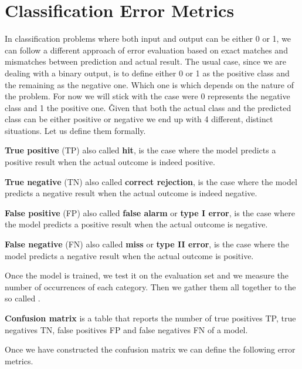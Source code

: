 \section{Classification Error Metrics}

In classification problems where both input and output can be either 0 or 1, we can follow a different approach of
error evaluation based on exact matches and mismatches between prediction and actual result. The usual case, since we
are dealing with a binary output, is to define either 0 or 1 as the positive class and the remaining as the negative
one. Which one is which depends on the nature of the problem. For now we will stick with the case were 0 represents
the negative class and 1 the positive one. \v

Given that both the actual class and the predicted class can be either positive or negative we end up with 4
different, distinct situations. Let us define them formally.

\textbf{True positive} (TP) also called \textbf{hit}, is the case where the model predicts a positive result when the
actual outcome is indeed positive.
\ed

\textbf{True negative} (TN) also called \textbf{correct rejection}, is the case where the model predicts a negative
result when the actual outcome is indeed negative.
\ed

\textbf{False positive} (FP) also called \textbf{false alarm} or \textbf{type I error}, is the case where the model
predicts a positive result when the actual outcome is negative.
\ed

\textbf{False negative} (FN) also called \textbf{miss} or \textbf{type II error}, is the case where the model
predicts a negative result when the actual outcome is positive.
\ed

Once the model is trained, we test it on the evaluation set and we measure the number of occurrences of each category. 
Then we gather them all together to the so called .

\textbf{Confusion matrix} is a table that reports the number of true positives TP, true negatives TN, false positives
FP and false negatives FN of a model.
\ed

\vspace{-5pt}


Once we have constructed the confusion matrix we can define the following error metrics.

